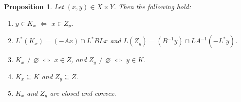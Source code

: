 \documentclass{article}
\providecommand{\siff}{\Leftrightarrow}
\newtheorem{proposition}[theorem]{Proposition}
\begin{document}
\begin{proposition}
\label{p:241120b}
Let $(x,y)\in X\times Y$. 
Then the following hold:
\begin{enumerate}
\item 
\label{p:241120b1}
$y\in K_x$ 
$\siff$ $x\in Z_y$. 
\item 
\label{p:241120b1.5}
$L^*(K_x) = (-Ax)\cap L^*BLx$ and 
$L(Z_y)= (B^{-1}y)\cap LA^{-1}(-L^*y)$.
\item 
\label{p:241120b2}
$K_x\neq\varnothing$
$\siff$ $x\in Z$, and
$Z_y\neq\varnothing$
$\siff$ $y\in K$.
\item 
\label{p:241120b3}
$K_x\subseteq K$ and 
$Z_y \subseteq Z$. 
\item 
\label{p:241120b4}
$K_x$ and $Z_y$ are closed and convex. 
\end{enumerate}
\end{proposition}
\end{document}
